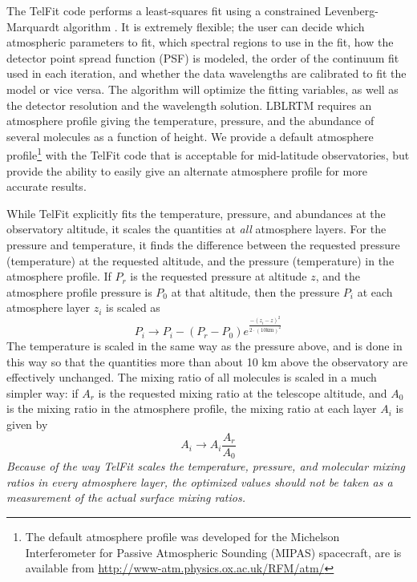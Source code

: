 The TelFit code performs a least-squares fit using a constrained Levenberg-Marquardt algorithm \citep{Marquardt1963}. It is extremely flexible; the user can decide which atmospheric parameters to fit, which spectral regions to use in the fit, how the detector point spread function (PSF) is modeled, the order of the continuum fit used in each iteration, and whether the data wavelengths are calibrated to fit the model or vice versa. The algorithm will optimize the fitting variables, as well as the detector resolution and the wavelength solution. LBLRTM requires an atmosphere profile giving the temperature, pressure, and the abundance of several molecules as a function of height. We provide a default atmosphere profile\footnote{The default atmosphere profile was developed for the Michelson Interferometer for Passive Atmospheric Sounding (MIPAS) spacecraft, are is available from \url{http://www-atm.physics.ox.ac.uk/RFM/atm/}} with the TelFit code that is acceptable for mid-latitude observatories, but provide the ability to easily give an alternate atmosphere profile for more accurate results. 

While TelFit explicitly fits the temperature, pressure, and abundances at the observatory altitude, it scales the quantities at \emph{all} atmosphere layers. For the pressure and temperature, it finds the difference between the requested pressure (temperature) at the requested altitude, and the pressure (temperature) in the atmosphere profile. If $P_r$ is the requested pressure at altitude $z$, and the atmosphere profile pressure is $P_0 $ at that altitude, then the pressure $P_i $ at each atmosphere layer $z_i$ is scaled as
\begin{equation*}
  P_i \rightarrow P_i - (P_r - P_0) e^{\frac{-(z_i - z)^2}{2\cdot (10 \mathrm{km})^2}}
\end{equation*}
The temperature is scaled in the same way as the pressure above, and is done in this way so that the quantities more than about 10 km above the observatory are effectively unchanged. The mixing ratio of all molecules is scaled in a much simpler way: if $A_r$ is the requested mixing ratio at the telescope altitude, and $A_0$ is the mixing ratio in the atmosphere profile, the mixing ratio at each layer $A_i$ is given by
\begin{equation*}
  A_i \rightarrow A_i  \frac{A_r}{A_0}
\end{equation*}
\emph{Because of the way TelFit scales the temperature, pressure, and molecular mixing ratios in every atmosphere layer, the optimized values should not be taken as a measurement of the actual surface mixing ratios.}

